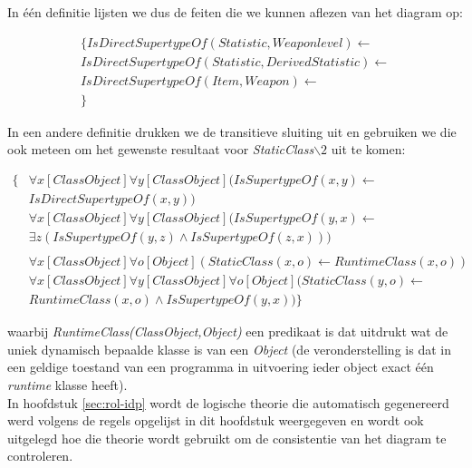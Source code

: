 In \'e\'en definitie lijsten we dus de feiten die we kunnen aflezen van het diagram op:

\begin{align*}
\{
	IsDirectSupertypeOf(Statistic,Weaponlevel) \leftarrow \\
	IsDirectSupertypeOf(Statistic,DerivedStatistic) \leftarrow \\
	IsDirectSupertypeOf(Item,Weapon) \leftarrow \\
\}
\end{align*}

In een andere definitie drukken we de transitieve sluiting uit en gebruiken we die ook meteen om het gewenste resultaat voor \textit{StaticClass$\backslash2$} uit te komen:

\begin{align*}
\{
	&\forall{x}[ClassObject]\forall{y}[ClassObject](IsSupertypeOf(x,y) \leftarrow \\ &IsDirectSupertypeOf(x,y)) \\
	&\forall{x}[ClassObject]\forall{y}[ClassObject](IsSupertypeOf(y,x) \leftarrow \\
	&\exists{z}(IsSupertypeOf(y,z) \land IsSupertypeOf(z,x)))
	\\
	\\
	&\forall{x}[ClassObject]\forall{o}[Object](StaticClass(x,o) \leftarrow RuntimeClass(x,o)) \\
	&\forall{x}[ClassObject]\forall{y}[ClassObject]\forall{o}[Object](StaticClass(y,o) \leftarrow \\ &RuntimeClass(x,o) \land IsSupertypeOf(y,x))
\}
\end{align*}

waarbij \textit{RuntimeClass(ClassObject,Object)} een predikaat is dat uitdrukt wat de uniek dynamisch bepaalde klasse is van een \textit{Object} (de veronderstelling is dat in een geldige toestand van een programma in uitvoering ieder object exact \'e\'en \textit{runtime} klasse heeft).
\\
In hoofdstuk \ref{sec:rol-idp} wordt de logische theorie die automatisch gegenereerd werd volgens de regels opgelijst in dit hoofdstuk weergegeven en wordt ook uitgelegd hoe die theorie wordt gebruikt om de consistentie van het diagram te controleren.